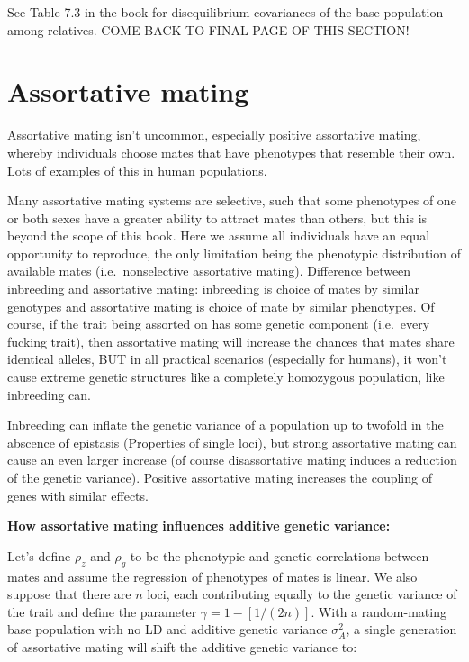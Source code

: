 \documentclass[
]{book}
\begin{document}
See Table 7.3 in the book for disequilibrium covariances of the base-population among relatives. COME BACK TO FINAL PAGE OF THIS SECTION!

\hypertarget{assortative-mating}{%
\section{Assortative mating}\label{assortative-mating}}

Assortative mating isn't uncommon, especially positive assortative mating, whereby individuals choose mates that have phenotypes that resemble their own. Lots of examples of this in human populations.

Many assortative mating systems are selective, such that some phenotypes of one or both sexes have a greater ability to attract mates than others, but this is beyond the scope of this book. Here we assume all individuals have an equal opportunity to reproduce, the only limitation being the phenotypic distribution of available mates (i.e.~nonselective assortative mating). Difference between inbreeding and assortative mating: inbreeding is choice of mates by similar genotypes and assortative mating is choice of mate by similar phenotypes. Of course, if the trait being assorted on has some genetic component (i.e.~every fucking trait), then assortative mating will increase the chances that mates share identical alleles, BUT in all practical scenarios (especially for humans), it won't cause extreme genetic structures like a completely homozygous population, like inbreeding can.

Inbreeding can inflate the genetic variance of a population up to twofold in the abscence of epistasis (\protect\hyperlink{properties-of-single-loci}{Properties of single loci}), but strong assortative mating can cause an even larger increase (of course disassortative mating induces a reduction of the genetic variance). Positive assortative mating increases the coupling of genes with similar effects.

\textbf{How assortative mating influences additive genetic variance:}

Let's define \(\rho_z\) and \(\rho_g\) to be the phenotypic and genetic correlations between mates and assume the regression of phenotypes of mates is linear. We also suppose that there are \(n\) loci, each contributing equally to the genetic variance of the trait and define the parameter \(\gamma = 1 - [1/(2n)]\). With a random-mating base population with no LD and additive genetic variance \(\sigma^2_{A}\), a single generation of assortative mating will shift the additive genetic variance to:
\end{document}

